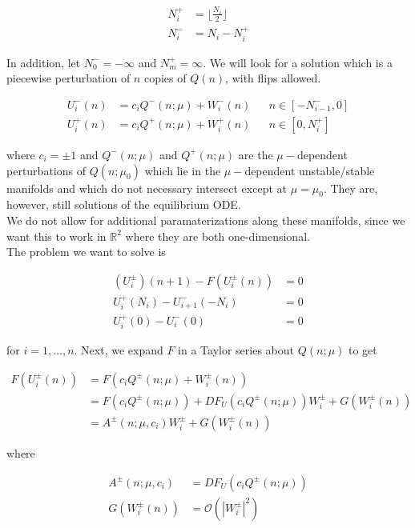 \documentclass[12pt]{article}
\def\R{{\mathbb R}}
\begin{document}
\begin{align*}
N_i^+ &= \lfloor \frac{N_i}{2} \rfloor \\
N_i^- &= N_i - N_i^+
\end{align*}

In addition, let $N_0^- = -\infty$ and $N_m^+ = \infty$. We will look for a solution which is a piecewise perturbation of $n$ copies of $Q(n)$, with flips allowed.

\begin{align*}
U_i^-(n) &= c_i Q^-(n; \mu) + W_i^-(n) && n \in [-N_{i-1}^-, 0] \\
U_i^+(n) &= c_i Q^+(n; \mu) + W_i^+(n) && n \in [0, N_i^+]
\end{align*}

where $c_i = \pm 1$ and $Q^-(n; \mu)$ and $Q^+(n;\mu)$ are the $\mu-$dependent perturbations of $Q(n; \mu_0)$ which lie in the $\mu-$dependent unstable/stable manifolds and which do not necessary intersect except at $\mu = \mu_0$. They are, however, still solutions of the equilibrium ODE.\\

We do not allow for additional paramaterizations along these manifolds, since we want this to work in $\R^2$ where they are both one-dimensional. \\

The problem we want to solve is

\begin{align}
(U_i^\pm)(n+1) - F(U_i^\pm(n)) &= 0 \\
U_i^+(N_i) - U_{i+1}^-(-N_i) &= 0 \\
U_i^+(0) - U_i^-(0) &= 0
\end{align}

for $i = 1, \dots, n$. Next, we expand $F$ in a Taylor series about $Q(n; \mu)$ to get

\begin{align*}
F(U_i^\pm(n)) &= F(c_i Q^\pm(n; \mu) + W_i^\pm(n)) \\
&= F(c_i Q^\pm(n; \mu)) + DF_{U}(c_i Q^\pm(n; \mu)) W_i^\pm + G(W_i^\pm(n)) \\
&= A^\pm(n; \mu, c_i) W_i^\pm + G(W_i^\pm(n))
\end{align*}

where

\begin{align*}
A^\pm(n; \mu, c_i) &= DF_{U}(c_i Q^\pm(n; \mu))\\
G(W_i^\pm(n)) &= \mathcal{O}(|W_i^\pm|^2)
\end{align*}
\end{document}
